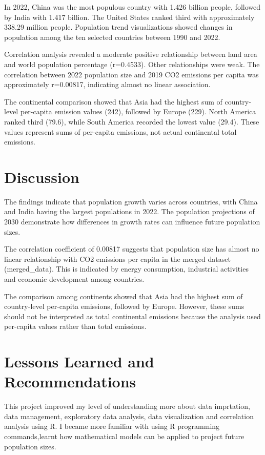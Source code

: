 \documentclass[10pt,a4paper]{article}
\begin{document}
In 2022, China was the most populous country with
1.426 billion people, followed by India with
1.417 billion. The United States ranked third
with approximately 338.29 million people.
Population trend visualizations showed changes
in population among the ten selected countries
between 1990 and 2022.

Correlation analysis revealed a moderate positive
relationship between land area and world population
percentage (r=0.4533). Other relationships were
weak. The correlation between 2022 population size
and 2019 CO2 emissions per capita was
approximately r=0.00817, indicating almost no
linear association.

The continental comparison showed that Asia had
the highest sum of country-level per-capita
emission values (242), followed by Europe (229).
North America ranked third (79.6), while South
America recorded the lowest value (29.4). These
values represent sums of per-capita emissions,
not actual continental total emissions.


\section{Discussion}

The findings indicate that population growth varies
 across countries, with China and India
having the largest populations in 2022. The population
projections of 2030  demonstrate how differences in
growth rates can influence future population sizes.

The correlation coefficient of 0.00817 suggests
that population size has almost no linear relationship
with CO2 emissions per capita in the merged
dataset (merged\_data). This is indicated by
energy consumption, industrial activities and
economic development among countries.

The comparison among continents showed that Asia had
the highest sum of country-level per-capita
emissions, followed by Europe. However, these sums
should not be interpreted as total continental
emissions because the analysis used per-capita
values rather than total emissions.



\section{Lessons Learned and Recommendations}

This project improved my level of  understanding more about data
imprtation, data management, exploratory data analysis, data
visualization and correlation analysis using R.
I became more familiar with using R programming 
commands,learnt how mathematical models
can be applied to project future population sizes.
\end{document}
